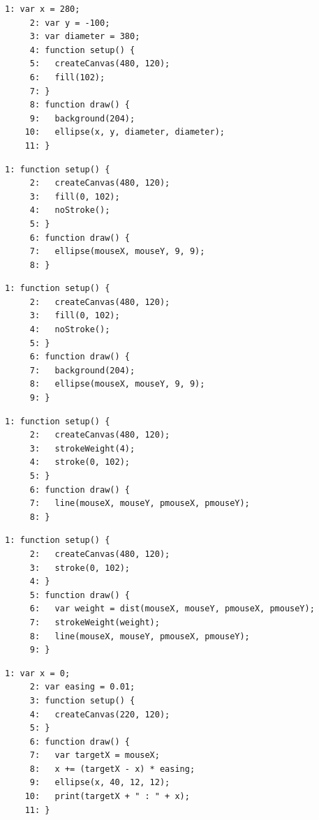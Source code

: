 \documentclass[a4j]{ltjsarticle}
\begin{document}
\begin{lstlisting}[caption=Ex\_05\_03.js]
     1: var x = 280;
     2: var y = -100;
     3: var diameter = 380;
     4: function setup() {
     5:   createCanvas(480, 120);
     6:   fill(102);
     7: }
     8: function draw() {
     9:   background(204);
    10:   ellipse(x, y, diameter, diameter);
    11: }
\end{lstlisting}
\vspace{1in}
\begin{lstlisting}[caption=Ex\_05\_04.js]
     1: function setup() {
     2:   createCanvas(480, 120);
     3:   fill(0, 102);
     4:   noStroke();
     5: }
     6: function draw() {
     7:   ellipse(mouseX, mouseY, 9, 9);
     8: }
\end{lstlisting}
\vspace{1in}
\begin{lstlisting}[caption=Ex\_05\_05.js]
     1: function setup() {
     2:   createCanvas(480, 120);
     3:   fill(0, 102);
     4:   noStroke();
     5: }
     6: function draw() {
     7:   background(204);
     8:   ellipse(mouseX, mouseY, 9, 9);
     9: }
\end{lstlisting}
\vspace{1in}
\begin{lstlisting}[caption=Ex\_05\_06.js]
     1: function setup() {
     2:   createCanvas(480, 120);
     3:   strokeWeight(4);
     4:   stroke(0, 102);
     5: }
     6: function draw() {
     7:   line(mouseX, mouseY, pmouseX, pmouseY);
     8: }
\end{lstlisting}
\vspace{1in}
\begin{lstlisting}[caption=Ex\_05\_07.js]
     1: function setup() {
     2:   createCanvas(480, 120);
     3:   stroke(0, 102);
     4: }
     5: function draw() {
     6:   var weight = dist(mouseX, mouseY, pmouseX, pmouseY);
     7:   strokeWeight(weight);
     8:   line(mouseX, mouseY, pmouseX, pmouseY);
     9: }
\end{lstlisting}
\vspace{1in}
\begin{lstlisting}[caption=Ex\_05\_08.js]
     1: var x = 0;
     2: var easing = 0.01;
     3: function setup() {
     4:   createCanvas(220, 120);
     5: }
     6: function draw() {
     7:   var targetX = mouseX;
     8:   x += (targetX - x) * easing;
     9:   ellipse(x, 40, 12, 12);
    10:   print(targetX + " : " + x);
    11: }
\end{lstlisting}
\vspace{1in}
\end{document}
